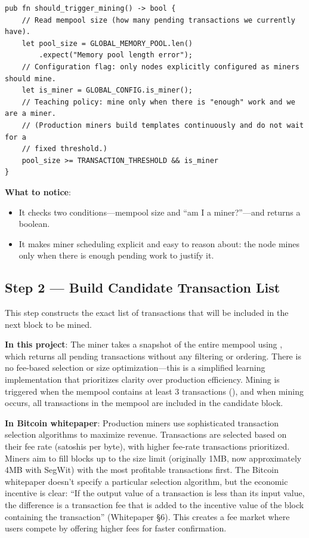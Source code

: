 \begin{listing}[htbp]
\caption{Mining trigger ()}
\label{lst:9-6-1}
\begin{verbatim}
pub fn should_trigger_mining() -> bool {
    // Read mempool size (how many pending transactions we currently have).
    let pool_size = GLOBAL_MEMORY_POOL.len()
        .expect("Memory pool length error");
    // Configuration flag: only nodes explicitly configured as miners should mine.
    let is_miner = GLOBAL_CONFIG.is_miner();
    // Teaching policy: mine only when there is "enough" work and we are a miner.
    // (Production miners build templates continuously and do not wait for a
    // fixed threshold.)
    pool_size >= TRANSACTION_THRESHOLD && is_miner
}
\end{verbatim}
\end{listing}

\textbf{What to notice}:
\begin{itemize}
  \item It checks two conditions---mempool size and ``am I a miner?''---and returns a boolean.
  \item It makes miner scheduling explicit and easy to reason about: the node mines only when there is enough pending work to justify it.
\end{itemize}

\subsection{Step 2 --- Build Candidate Transaction List}
\label{sec:ch09-6-step2}

This step constructs the exact list of transactions that will be included in the next block to be mined.

\textbf{In this project}: The miner takes a snapshot of the entire mempool using , which returns all pending transactions without any filtering or ordering. There is no fee-based selection or size optimization---this is a simplified learning implementation that prioritizes clarity over production efficiency. Mining is triggered when the mempool contains at least 3 transactions (), and when mining occurs, all transactions in the mempool are included in the candidate block.

\textbf{In Bitcoin whitepaper}: Production miners use sophisticated transaction selection algorithms to maximize revenue. Transactions are selected based on their fee rate (satoshis per byte), with higher fee-rate transactions prioritized. Miners aim to fill blocks up to the size limit (originally 1MB, now approximately 4MB with SegWit) with the most profitable transactions first. The Bitcoin whitepaper doesn't specify a particular selection algorithm, but the economic incentive is clear: ``If the output value of a transaction is less than its input value, the difference is a transaction fee that is added to the incentive value of the block containing the transaction'' (Whitepaper \S6). This creates a fee market where users compete by offering higher fees for faster confirmation.

